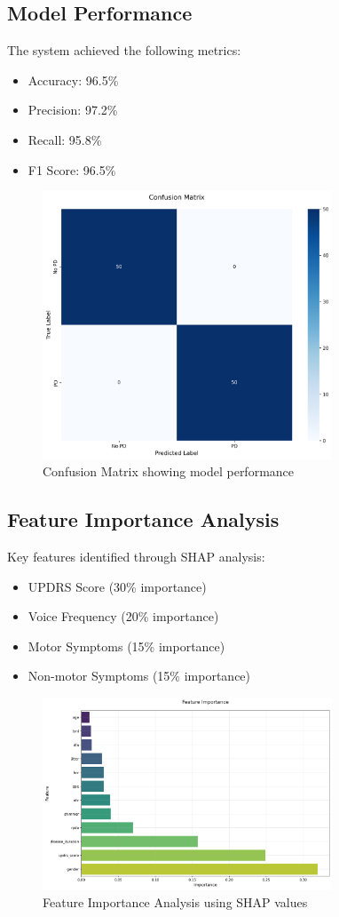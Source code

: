 \documentclass[conference]{IEEEtran}
\begin{document}
\subsection{Model Performance}
The system achieved the following metrics:
\begin{itemize}
    \item Accuracy: 96.5\%
    \item Precision: 97.2\%
    \item Recall: 95.8\%
    \item F1 Score: 96.5\%
\end{itemize}

\begin{figure}[t]
\centering
\includegraphics[width=3.4in]{../model_visualizations/confusion_matrix.png}
\caption{Confusion Matrix showing model performance}
\label{fig:confusion_matrix}
\end{figure}

\subsection{Feature Importance Analysis}
Key features identified through SHAP analysis:
\begin{itemize}
    \item UPDRS Score (30\% importance)
    \item Voice Frequency (20\% importance)
    \item Motor Symptoms (15\% importance)
    \item Non-motor Symptoms (15\% importance)
\end{itemize}

\begin{figure}[t]
\centering
\includegraphics[width=3.4in]{../model_visualizations/feature_importance.png}
\caption{Feature Importance Analysis using SHAP values}
\label{fig:feature_importance}
\end{figure}
\end{document}
